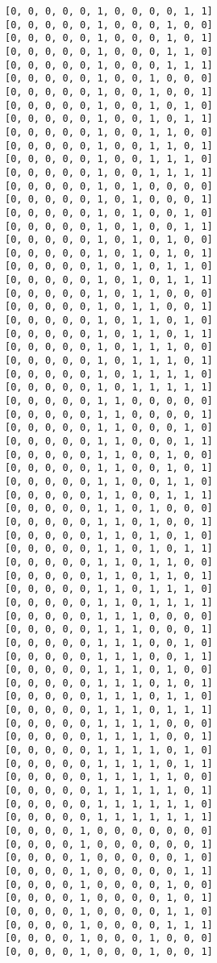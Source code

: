 \documentclass[11pt]{article}
\begin{document}
\begin{Verbatim}[commandchars=\\\{\}]
[0, 0, 0, 0, 0, 1, 0, 0, 0, 0, 1, 1]
[0, 0, 0, 0, 0, 1, 0, 0, 0, 1, 0, 0]
[0, 0, 0, 0, 0, 1, 0, 0, 0, 1, 0, 1]
[0, 0, 0, 0, 0, 1, 0, 0, 0, 1, 1, 0]
[0, 0, 0, 0, 0, 1, 0, 0, 0, 1, 1, 1]
[0, 0, 0, 0, 0, 1, 0, 0, 1, 0, 0, 0]
[0, 0, 0, 0, 0, 1, 0, 0, 1, 0, 0, 1]
[0, 0, 0, 0, 0, 1, 0, 0, 1, 0, 1, 0]
[0, 0, 0, 0, 0, 1, 0, 0, 1, 0, 1, 1]
[0, 0, 0, 0, 0, 1, 0, 0, 1, 1, 0, 0]
[0, 0, 0, 0, 0, 1, 0, 0, 1, 1, 0, 1]
[0, 0, 0, 0, 0, 1, 0, 0, 1, 1, 1, 0]
[0, 0, 0, 0, 0, 1, 0, 0, 1, 1, 1, 1]
[0, 0, 0, 0, 0, 1, 0, 1, 0, 0, 0, 0]
[0, 0, 0, 0, 0, 1, 0, 1, 0, 0, 0, 1]
[0, 0, 0, 0, 0, 1, 0, 1, 0, 0, 1, 0]
[0, 0, 0, 0, 0, 1, 0, 1, 0, 0, 1, 1]
[0, 0, 0, 0, 0, 1, 0, 1, 0, 1, 0, 0]
[0, 0, 0, 0, 0, 1, 0, 1, 0, 1, 0, 1]
[0, 0, 0, 0, 0, 1, 0, 1, 0, 1, 1, 0]
[0, 0, 0, 0, 0, 1, 0, 1, 0, 1, 1, 1]
[0, 0, 0, 0, 0, 1, 0, 1, 1, 0, 0, 0]
[0, 0, 0, 0, 0, 1, 0, 1, 1, 0, 0, 1]
[0, 0, 0, 0, 0, 1, 0, 1, 1, 0, 1, 0]
[0, 0, 0, 0, 0, 1, 0, 1, 1, 0, 1, 1]
[0, 0, 0, 0, 0, 1, 0, 1, 1, 1, 0, 0]
[0, 0, 0, 0, 0, 1, 0, 1, 1, 1, 0, 1]
[0, 0, 0, 0, 0, 1, 0, 1, 1, 1, 1, 0]
[0, 0, 0, 0, 0, 1, 0, 1, 1, 1, 1, 1]
[0, 0, 0, 0, 0, 1, 1, 0, 0, 0, 0, 0]
[0, 0, 0, 0, 0, 1, 1, 0, 0, 0, 0, 1]
[0, 0, 0, 0, 0, 1, 1, 0, 0, 0, 1, 0]
[0, 0, 0, 0, 0, 1, 1, 0, 0, 0, 1, 1]
[0, 0, 0, 0, 0, 1, 1, 0, 0, 1, 0, 0]
[0, 0, 0, 0, 0, 1, 1, 0, 0, 1, 0, 1]
[0, 0, 0, 0, 0, 1, 1, 0, 0, 1, 1, 0]
[0, 0, 0, 0, 0, 1, 1, 0, 0, 1, 1, 1]
[0, 0, 0, 0, 0, 1, 1, 0, 1, 0, 0, 0]
[0, 0, 0, 0, 0, 1, 1, 0, 1, 0, 0, 1]
[0, 0, 0, 0, 0, 1, 1, 0, 1, 0, 1, 0]
[0, 0, 0, 0, 0, 1, 1, 0, 1, 0, 1, 1]
[0, 0, 0, 0, 0, 1, 1, 0, 1, 1, 0, 0]
[0, 0, 0, 0, 0, 1, 1, 0, 1, 1, 0, 1]
[0, 0, 0, 0, 0, 1, 1, 0, 1, 1, 1, 0]
[0, 0, 0, 0, 0, 1, 1, 0, 1, 1, 1, 1]
[0, 0, 0, 0, 0, 1, 1, 1, 0, 0, 0, 0]
[0, 0, 0, 0, 0, 1, 1, 1, 0, 0, 0, 1]
[0, 0, 0, 0, 0, 1, 1, 1, 0, 0, 1, 0]
[0, 0, 0, 0, 0, 1, 1, 1, 0, 0, 1, 1]
[0, 0, 0, 0, 0, 1, 1, 1, 0, 1, 0, 0]
[0, 0, 0, 0, 0, 1, 1, 1, 0, 1, 0, 1]
[0, 0, 0, 0, 0, 1, 1, 1, 0, 1, 1, 0]
[0, 0, 0, 0, 0, 1, 1, 1, 0, 1, 1, 1]
[0, 0, 0, 0, 0, 1, 1, 1, 1, 0, 0, 0]
[0, 0, 0, 0, 0, 1, 1, 1, 1, 0, 0, 1]
[0, 0, 0, 0, 0, 1, 1, 1, 1, 0, 1, 0]
[0, 0, 0, 0, 0, 1, 1, 1, 1, 0, 1, 1]
[0, 0, 0, 0, 0, 1, 1, 1, 1, 1, 0, 0]
[0, 0, 0, 0, 0, 1, 1, 1, 1, 1, 0, 1]
[0, 0, 0, 0, 0, 1, 1, 1, 1, 1, 1, 0]
[0, 0, 0, 0, 0, 1, 1, 1, 1, 1, 1, 1]
[0, 0, 0, 0, 1, 0, 0, 0, 0, 0, 0, 0]
[0, 0, 0, 0, 1, 0, 0, 0, 0, 0, 0, 1]
[0, 0, 0, 0, 1, 0, 0, 0, 0, 0, 1, 0]
[0, 0, 0, 0, 1, 0, 0, 0, 0, 0, 1, 1]
[0, 0, 0, 0, 1, 0, 0, 0, 0, 1, 0, 0]
[0, 0, 0, 0, 1, 0, 0, 0, 0, 1, 0, 1]
[0, 0, 0, 0, 1, 0, 0, 0, 0, 1, 1, 0]
[0, 0, 0, 0, 1, 0, 0, 0, 0, 1, 1, 1]
[0, 0, 0, 0, 1, 0, 0, 0, 1, 0, 0, 0]
[0, 0, 0, 0, 1, 0, 0, 0, 1, 0, 0, 1]

\end{Verbatim}
\end{document}
